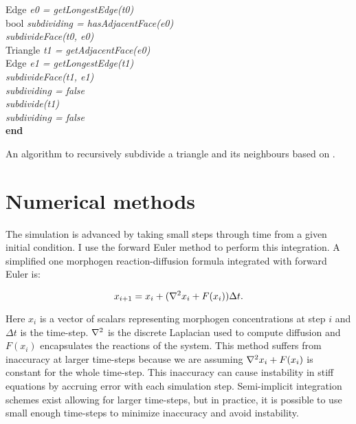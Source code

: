 \begin{algorithm}[!ht]
  {
   Edge \textit{e0 = getLongestEdge(t0)}\\
   bool \textit{subdividing = hasAdjacentFace(e0)}\\
   \textit{subdivideFace(t0, e0)}\\
   {
    {
      Triangle \textit{t1 = getAdjacentFace(e0)}\\
      Edge \textit{e1 = getLongestEdge(t1)}\\
      {
       \textit{subdivideFace(t1, e1)}\\
       \textit{subdividing = false}\\
      }{
        \textit{subdivide(t1)}\\   
      }
    }{
     \textit{subdividing = false}\\
    }
   }
  }
  \textbf{end}
  \caption{An algorithm to recursively subdivide a triangle and its neighbours based on \cite{RIVARA1998}.}
  \label{alg:subdivisionAlgorithm}
\end{algorithm}

\section{Numerical methods}
The simulation is advanced by taking small steps through time from a given initial condition. I use the forward Euler method \cite{solomon2015numerical} to perform this integration. A simplified one morphogen reaction-diffusion formula integrated with forward Euler is:

\[
	x_{i+1} = x_{i} + (\nabla^2{}x_i + F(x_i))\Delta t. \\
\] 

Here $x_i$ is a vector of scalars representing morphogen concentrations at step $i$ and $\Delta t$ is the time-step. $\nabla^2{}$ is the discrete Laplacian used to compute diffusion and $F(x_i)$ encapsulates the reactions of the system. This method suffers from inaccuracy at larger time-steps because we are assuming $\nabla^2{}x_i + F(x_i)$ is constant for the whole time-step. This inaccuracy can cause instability in stiff equations by accruing error with each simulation step. Semi-implicit integration schemes exist \cite{Nie2006} allowing for larger time-steps, but in practice, it is possible to use small enough time-steps to minimize inaccuracy and avoid instability. 